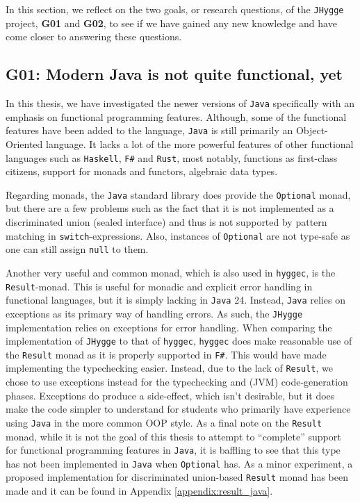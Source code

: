 In this section, we reflect on the two goals, or research questions, of the
\texttt{JHygge} project, \textbf{G01} and \textbf{G02}, to see if we have gained
any new knowledge and have come closer to answering these questions.

\subsection{\textbf{G01}: Modern Java is not quite functional, yet}

In this thesis, we have investigated the newer versions of \texttt{Java} specifically with an emphasis on functional programming features.
Although, some of the functional features have been added to the language, \texttt{Java} is still primarily an Object-Oriented language.
It lacks a lot of the more powerful features of other functional languages such as \texttt{Haskell}, \texttt{F\#} and \texttt{Rust},
most notably, functions as first-class citizens, support for monads and functors, algebraic data types.

Regarding monads, the \texttt{Java} standard library does provide the \texttt{Optional}\cite{java_optional} monad, but there are a few problems such as the
fact that it is not implemented as a discriminated union (sealed interface) and thus is not supported by pattern matching in
\texttt{switch}-expressions. Also, instances of \texttt{Optional} are not type-safe as one can still assign \texttt{null} to them.

Another very useful and common monad, which is also used in \texttt{hyggec}, is the \texttt{Result}-monad. This is useful for monadic
and explicit error handling in functional languages, but it is simply lacking in \texttt{Java} 24. Instead, \texttt{Java} relies on
exceptions as its primary way of handling errors. As such, the \texttt{JHygge} implementation relies on exceptions for error handling.
When comparing the implementation of \texttt{JHygge} to that of \texttt{hyggec}, \texttt{hyggec} does make reasonable use of the \texttt{Result}
monad as it is properly supported in \texttt{F\#}. This would have made implementing the typechecking easier. Instead, due to the lack
of \texttt{Result}, we chose to use exceptions instead for the typechecking and (JVM) code-generation phases. Exceptions do produce a
side-effect, which isn't desirable, but it does make the code simpler to understand for students who primarily have experience using
\texttt{Java} in the more common OOP style. As a final note on the \texttt{Result} monad, while it is not the goal of this thesis to attempt
to ``complete'' support for functional programming features in \texttt{Java}, it is baffling to see that this type has not been implemented
in \texttt{Java} when \texttt{Optional} has. As a minor experiment, a proposed implementation for discriminated union-based \texttt{Result}
monad has been made and it can be found in Appendix \ref{appendix:result_java}.


